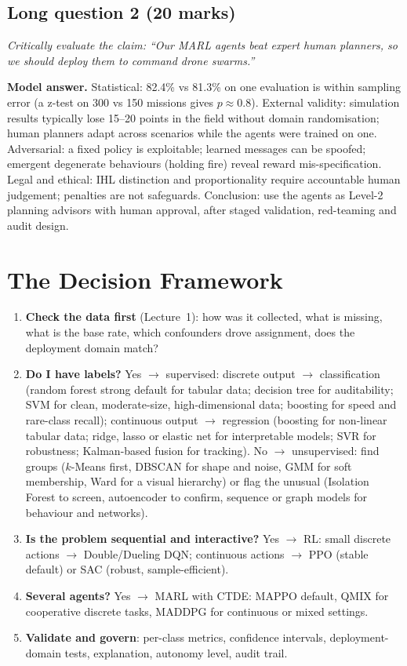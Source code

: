 \documentclass[11pt]{article}
\begin{document}
\subsection{Long question 2 (20 marks)}
\emph{Critically evaluate the claim: ``Our MARL agents beat expert human planners, so we should deploy them to command drone swarms.''}

\textbf{Model answer.} Statistical: 82.4\% vs 81.3\% on one evaluation is within sampling error (a z-test on 300 vs 150 missions gives $p\approx0.8$). External validity: simulation results typically lose 15--20 points in the field without domain randomisation; human planners adapt across scenarios while the agents were trained on one. Adversarial: a fixed policy is exploitable; learned messages can be spoofed; emergent degenerate behaviours (holding fire) reveal reward mis-specification. Legal and ethical: IHL distinction and proportionality require accountable human judgement; penalties are not safeguards. Conclusion: use the agents as Level-2 planning advisors with human approval, after staged validation, red-teaming and audit design.

\section{The Decision Framework}
\begin{enumerate}
\item \textbf{Check the data first} (Lecture~1): how was it collected, what is missing, what is the base rate, which confounders drove assignment, does the deployment domain match?
\item \textbf{Do I have labels?} Yes $\to$ supervised: discrete output $\to$ classification (random forest strong default for tabular data; decision tree for auditability; SVM for clean, moderate-size, high-dimensional data; boosting for speed and rare-class recall); continuous output $\to$ regression (boosting for non-linear tabular data; ridge, lasso or elastic net for interpretable models; SVR for robustness; Kalman-based fusion for tracking). No $\to$ unsupervised: find groups ($k$-Means first, DBSCAN for shape and noise, GMM for soft membership, Ward for a visual hierarchy) or flag the unusual (Isolation Forest to screen, autoencoder to confirm, sequence or graph models for behaviour and networks).
\item \textbf{Is the problem sequential and interactive?} Yes $\to$ RL: small discrete actions $\to$ Double/Dueling DQN; continuous actions $\to$ PPO (stable default) or SAC (robust, sample-efficient).
\item \textbf{Several agents?} Yes $\to$ MARL with CTDE: MAPPO default, QMIX for cooperative discrete tasks, MADDPG for continuous or mixed settings.
\item \textbf{Validate and govern}: per-class metrics, confidence intervals, deployment-domain tests, explanation, autonomy level, audit trail.
\end{enumerate}
\end{document}
